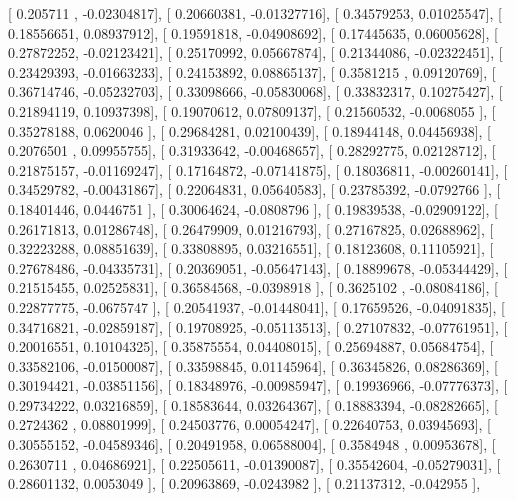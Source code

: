 \documentclass{article}
\begin{document}
       [ 0.205711  , -0.02304817],
       [ 0.20660381, -0.01327716],
       [ 0.34579253,  0.01025547],
       [ 0.18556651,  0.08937912],
       [ 0.19591818, -0.04908692],
       [ 0.17445635,  0.06005628],
       [ 0.27872252, -0.02123421],
       [ 0.25170992,  0.05667874],
       [ 0.21344086, -0.02322451],
       [ 0.23429393, -0.01663233],
       [ 0.24153892,  0.08865137],
       [ 0.3581215 ,  0.09120769],
       [ 0.36714746, -0.05232703],
       [ 0.33098666, -0.05830068],
       [ 0.33832317,  0.10275427],
       [ 0.21894119,  0.10937398],
       [ 0.19070612,  0.07809137],
       [ 0.21560532, -0.0068055 ],
       [ 0.35278188,  0.0620046 ],
       [ 0.29684281,  0.02100439],
       [ 0.18944148,  0.04456938],
       [ 0.2076501 ,  0.09955755],
       [ 0.31933642, -0.00468657],
       [ 0.28292775,  0.02128712],
       [ 0.21875157, -0.01169247],
       [ 0.17164872, -0.07141875],
       [ 0.18036811, -0.00260141],
       [ 0.34529782, -0.00431867],
       [ 0.22064831,  0.05640583],
       [ 0.23785392, -0.0792766 ],
       [ 0.18401446,  0.0446751 ],
       [ 0.30064624, -0.0808796 ],
       [ 0.19839538, -0.02909122],
       [ 0.26171813,  0.01286748],
       [ 0.26479909,  0.01216793],
       [ 0.27167825,  0.02688962],
       [ 0.32223288,  0.08851639],
       [ 0.33808895,  0.03216551],
       [ 0.18123608,  0.11105921],
       [ 0.27678486, -0.04335731],
       [ 0.20369051, -0.05647143],
       [ 0.18899678, -0.05344429],
       [ 0.21515455,  0.02525831],
       [ 0.36584568, -0.0398918 ],
       [ 0.3625102 , -0.08084186],
       [ 0.22877775, -0.0675747 ],
       [ 0.20541937, -0.01448041],
       [ 0.17659526, -0.04091835],
       [ 0.34716821, -0.02859187],
       [ 0.19708925, -0.05113513],
       [ 0.27107832, -0.07761951],
       [ 0.20016551,  0.10104325],
       [ 0.35875554,  0.04408015],
       [ 0.25694887,  0.05684754],
       [ 0.33582106, -0.01500087],
       [ 0.33598845,  0.01145964],
       [ 0.36345826,  0.08286369],
       [ 0.30194421, -0.03851156],
       [ 0.18348976, -0.00985947],
       [ 0.19936966, -0.07776373],
       [ 0.29734222,  0.03216859],
       [ 0.18583644,  0.03264367],
       [ 0.18883394, -0.08282665],
       [ 0.2724362 ,  0.08801999],
       [ 0.24503776,  0.00054247],
       [ 0.22640753,  0.03945693],
       [ 0.30555152, -0.04589346],
       [ 0.20491958,  0.06588004],
       [ 0.3584948 ,  0.00953678],
       [ 0.2630711 ,  0.04686921],
       [ 0.22505611, -0.01390087],
       [ 0.35542604, -0.05279031],
       [ 0.28601132,  0.0053049 ],
       [ 0.20963869, -0.0243982 ],
       [ 0.21137312, -0.042955  ],
\end{document}
